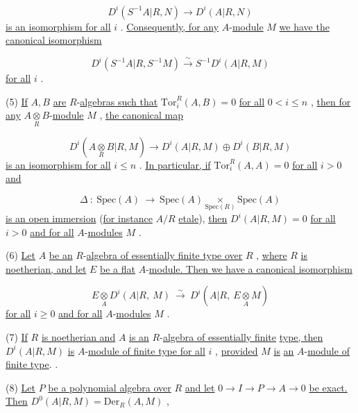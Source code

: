 $$D^i(S^{-1}A|R, N) \to D^i(A|R, N)$$
\underline{is an isomorphism for all}  $i$  . \underline{Consequently, for any} $A$-\underline{module}  $M$  \underline{we have the} \underline{canonical isomorphism}

$$D^i(S^{-1}A|R, S^{-1}M) \xrightarrow{\sim} S^{-1}D^i(A|R, M)$$
\underline{for all}  $i$  .

(5)  \underline{If}  $A, B$  \underline{are} $R$-\underline{algebras such that}  $\mathrm{Tor}_i^R(A, B) = 0$  \underline{for all} $0 < i \leq n$  , \underline{then for any}  $A\underset{R}{\otimes}B$-\underline{module}  $M$  , \underline{the canonical map}

$$D^i(A\underset{R}{\otimes}B|R, M) \to D^i(A|R, M) \oplus D^i(B|R, M)$$
\underline{is an isomorphism for all}  $i \leq n$  . \underline{In particular, if}  $\mathrm{Tor}_i^R(A, A) = 0$  \underline{for all}
$i > 0$  \underline{and}

\begin{equation*}
\Delta \ : \ \mathrm{Spec}(A) \ \to \ \mathrm{Spec}(A) \underset{\mathrm{Spec}(R)}{\times} \mathrm{Spec}(A)
\end{equation*}
\underline{is an open immersion} (\underline{for instance}  $A/R$  \underline{etale}), \underline{then}  $D^i(A|R, M) = 0$  \underline{for all} $i > 0$  \underline{and for all} $A$-\underline{modules}  $M$ .

(6) \underline{Let}  $A$  \underline{be an} $R$-\underline{algebra of essentially finite type over}  $R$ , \underline{where} $R$  \underline{is noetherian, and let}  $E$  \underline{be a flat} $A$-\underline{module. Then we have a canonical isomorphism}

\begin{equation*}
E \underset{A}{\otimes} D^i(A|R, \ M) \ \overset{\sim}{\longrightarrow} \ D^i(A|R, \ E \underset{A}{\otimes} M)
\end{equation*}
\underline{for all}  $i \geq 0$  \underline{and for all} $A$-\underline{modules}  $M$ .

(7) \underline{If}  $R$  \underline{is noetherian and}  $A$  \underline{is an} $R$-\underline{algebra of essentially finite} \underline{type, then}  $D^i(A|R, M)$  \underline{is} $A$-\underline{module of finite type for all}  $i$ , \underline{provided}  $M$  \underline{is} \underline{an} $A$-\underline{module of finite type}.                                                                          .

(8) \underline{Let}  $P$  \underline{be a polynomial algebra over}  $R$  \underline{and let}  $0 \to I \to P \to A \to 0$ \underline{be exact. Then}  $D^0(A|R, M) = \mathrm{Der}_R(A, M)$  ,


